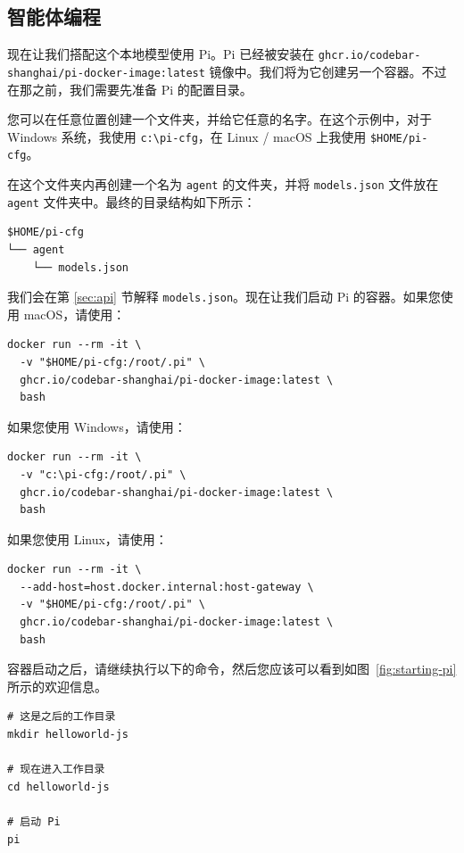\documentclass[a4paper,12pt]{article}
\newcommand{\code}[1]{\texttt{\nolinkurl{#1}}}
\begin{document}
\subsection{智能体编程}

现在让我们搭配这个本地模型使用 Pi。Pi 已经被安装在 \code{ghcr.io/codebar-shanghai/pi-docker-image:latest} 镜像中。我们将为它创建另一个容器。不过在那之前，我们需要先准备 Pi 的配置目录。

您可以在任意位置创建一个文件夹，并给它任意的名字。在这个示例中，对于 Windows 系统，我使用 \texttt{c:\textbackslash{}pi-cfg}，在 Linux / macOS 上我使用 \texttt{\$HOME/pi-cfg}。

在这个文件夹内再创建一个名为 \texttt{agent} 的文件夹，并将 \texttt{models.json} 文件放在 \texttt{agent} 文件夹中。最终的目录结构如下所示：

\begin{verbatim}
$HOME/pi-cfg
└── agent
    └── models.json
\end{verbatim}

我们会在第 \ref{sec:api} 节解释 \texttt{models.json}。现在让我们启动 Pi 的容器。如果您使用 macOS，请使用：

\begin{verbatim}
docker run --rm -it \
  -v "$HOME/pi-cfg:/root/.pi" \
  ghcr.io/codebar-shanghai/pi-docker-image:latest \
  bash
\end{verbatim}

如果您使用 Windows，请使用：

\begin{verbatim}
docker run --rm -it \
  -v "c:\pi-cfg:/root/.pi" \
  ghcr.io/codebar-shanghai/pi-docker-image:latest \
  bash
\end{verbatim}

如果您使用 Linux，请使用：

\begin{verbatim}
docker run --rm -it \
  --add-host=host.docker.internal:host-gateway \
  -v "$HOME/pi-cfg:/root/.pi" \
  ghcr.io/codebar-shanghai/pi-docker-image:latest \
  bash
\end{verbatim}

容器启动之后，请继续执行以下的命令，然后您应该可以看到如图~\ref{fig:starting-pi} 所示的欢迎信息。

\begin{verbatim}
# 这是之后的工作目录
mkdir helloworld-js

# 现在进入工作目录
cd helloworld-js

# 启动 Pi
pi
\end{verbatim}
\end{document}
